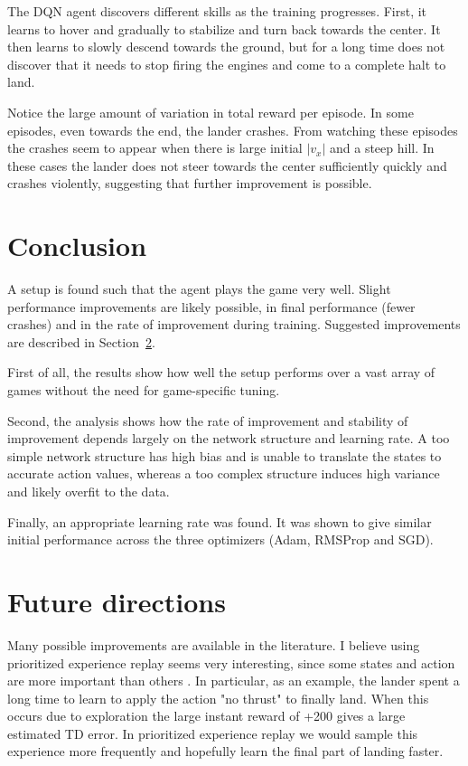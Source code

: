 \documentclass{article}
\begin{document}
The DQN agent discovers different skills as the training progresses. First, it learns to hover and gradually to stabilize and turn back towards the center. It then learns to slowly descend towards the ground, but for a long time does not discover that it needs to stop firing the engines and come to a complete halt to land.

Notice the large amount of variation in total reward per episode. In some episodes, even towards the end, the lander crashes. From watching these episodes the crashes seem to appear when there is large initial $|v_x|$ and a steep hill. In these cases the lander does not steer towards the center sufficiently quickly and crashes violently, suggesting that further improvement is possible.

\section{Conclusion}
\label{conclusion}
A setup is found such that the agent plays the game very well. Slight performance improvements are likely possible, in final performance (fewer crashes) and in the rate of improvement during training. Suggested improvements are described in Section~\ref{improve}.

First of all, the results show how well the setup \cite{mnih2015humanlevel} performs over a vast array of games without the need for game-specific tuning.

Second, the analysis shows how the rate of improvement and stability of improvement depends largely on the network structure and learning rate. A too simple network structure has high bias and is unable to translate the states to accurate action values, whereas a too complex structure induces high variance and likely overfit to the data.

Finally, an appropriate learning rate was found. It was shown to give similar initial performance across the three optimizers (Adam, RMSProp and SGD).

\section{Future directions}
\label{improve}
Many possible improvements are available in the literature. I believe using prioritized experience replay seems very interesting, since some states and action are more important than others \cite{Schaul2016PrioritizedER}. In particular, as an example, the lander spent a long time to learn to apply the action "no thrust" to finally land. When this occurs due to exploration the large instant reward of +200 gives a large estimated TD error. In prioritized experience replay we would sample this experience more frequently and hopefully learn the final part of landing faster.
\end{document}
